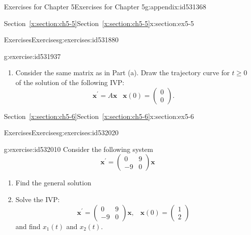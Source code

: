 \documentclass[oneside,10pt,]{book}
\newcommand{\xreffont}{\relax}
\numberwithin{equation}{section}
\numberwithin{equation}{section}
\newcommand{\amp}{&}
\begin{document}
\begin{appendixptx}{Exercises for Chapter 5}{}{Exercises for Chapter 5}{}{}{g:appendix:id531368}
\begin{sectionptx}{Section~{\xreffont\ref*{x:section:ch5-5}}}{}{Section~{\xreffont\ref*{x:section:ch5-5}}}{}{}{x:section:ex5-5}
\begin{exercises-subsection-numberless}{Exercises}{}{Exercises}{}{}{g:exercises:id531880}
\begin{divisionexercise}{2}{}{}{g:exercise:id531937}
\begin{enumerate}[label=(\alph*)]
%
\item{}Consider the same matrix as in Part (a). Draw the trajectory curve for \(t\geq0\) of the solution of the following IVP:%
\begin{equation*}
\mathbf{x}^{\prime}=A\mathbf{x}\,\,\,\,\,\mathbf{x}(0)=\left(\begin{array}{c}
0\\
0
\end{array}\right).
\end{equation*}
%
\end{enumerate}
\end{divisionexercise}%
\end{exercises-subsection-numberless}
\end{sectionptx}
%
%
\typeout{************************************************}
\typeout{Section F.6 Section~{\xreffont\ref*{x:section:ch5-6}}}
\typeout{************************************************}
%
\begin{sectionptx}{Section~{\xreffont\ref*{x:section:ch5-6}}}{}{Section~{\xreffont\ref*{x:section:ch5-6}}}{}{}{x:section:ex5-6}
%
%
\typeout{************************************************}
\typeout{************************************************}
%
\begin{exercises-subsection-numberless}{Exercises}{}{Exercises}{}{}{g:exercises:id532020}
\begin{divisionexercise}{1}{}{}{g:exercise:id532010}%
Consider the following system%
\begin{equation*}
\mathbf{x}^{\prime}=\left(\begin{array}{cc}
0 \amp 9\\
-9 \amp 0
\end{array}\right)\mathbf{x}
\end{equation*}
%
%
\begin{enumerate}[label=(\alph*)]
\item{}Find the general solution%
\item{}Solve the IVP:%
\begin{equation*}
\mathbf{x}^{\prime}=\left(\begin{array}{cc}
0 \amp 9\\
-9 \amp 0
\end{array}\right)\mathbf{x},\,\,\,\,\,\mathbf{x}(0)=\left(\begin{array}{c}
1\\
2
\end{array}\right)
\end{equation*}
and find \(x_{1}(t)\) and \(x_{2}(t)\).%

\end{enumerate}
\end{divisionexercise}
\end{exercises-subsection-numberless}
\end{sectionptx}
\end{appendixptx}
\end{document}
